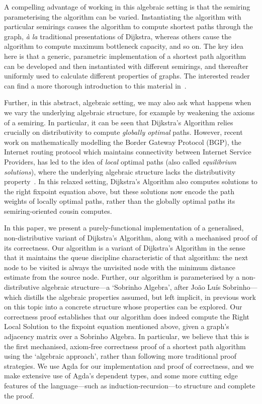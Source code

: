 A compelling advantage of working in this algebraic setting is that the semiring parameterising the algorithm can be varied.
Instantiating the algorithm with particular semirings causes the algorithm to compute shortest paths through the graph, \emph{à la} traditional presentations of Dijkstra, whereas others cause the algorithm to compute maximum bottleneck capacity, and so on.
The key idea here is that a generic, parametric implementation of a shortest path algorithm can be developed and then instantiated with different semirings, and thereafter uniformly used to calculate different properties of graphs.
The interested reader can find a more thorough introduction to this material in~\cite{gondran_graphs_2008}.

Further, in this abstract, algebraic setting, we may also ask what happens when we vary the underlying algebraic structure, for example by weakening the axioms of a semiring.
In particular, it can be seen that Dijkstra's Algorithm relies crucially on distributivity to compute \emph{globally optimal} paths.
However, recent work on mathematically modelling the Border Gateway Protocol (BGP), the Internet routing protocol which maintains connectivity between Internet Service Providers, has led to the idea of \emph{local} optimal paths (also called \emph{equilibrium solutions}), where the underlying algebraic structure lacks the distributivity property~\cite{sobrinho_routing_2010}.
In this relaxed setting, Dijkstra's Algorithm also computes solutions to the right fixpoint equation above, but these solutions now encode the path weights of locally optimal paths, rather than the globally optimal paths its semiring-oriented cousin computes.

In this paper, we present a purely-functional implementation of a generalised, non-distributive variant of Dijkstra's Algorithm, along with a mechanised proof of its correctness.
Our algorithm is a variant of Dijkstra's Algorithm in the sense that it maintains the queue discipline characteristic of that algorithm: the next node to be visited is always the unvisited node with the minimum distance estimate from the source node.
Further, our algorithm is parameterised by a non-distributive algebraic structure---a `Sobrinho Algebra', after Jo\~ao Lu\'is Sobrinho---which distills the algebraic properties assumed, but left implicit, in previous work on this topic into a concrete structure whose properties can be explored.
Our correctness proof establishes that our algorithm does indeed compute the Right Local Solution to the fixpoint equation mentioned above, given a graph's adjacency matrix over a Sobrinho Algebra.
In particular, we believe that this is the first mechanised, axiom-free correctness proof of a shortest path algorithm using the `algebraic approach', rather than following more traditional proof strategies.
We use Agda for our implementation and proof of correctness, and we make extensive use of Agda's dependent types, and some more cutting edge features of the language---such as induction-recursion---to structure and complete the proof.

